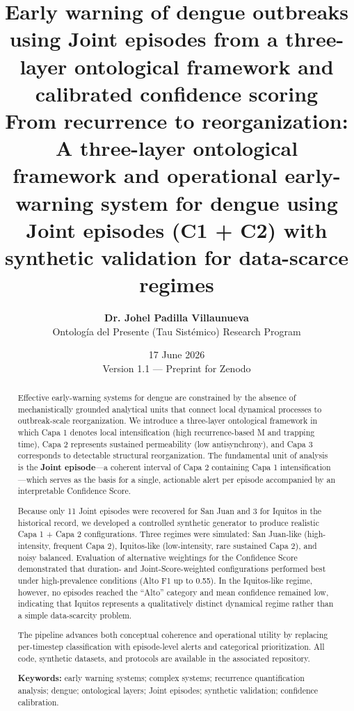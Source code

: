 \documentclass[11pt,a4paper]{article}
\title{\textbf{Early warning of dengue outbreaks using Joint episodes from a three-layer ontological framework and calibrated confidence scoring}\\[0.35em]
\large From recurrence to reorganization: A three-layer ontological framework and operational early-warning system for dengue using Joint episodes (C1 + C2) with synthetic validation for data-scarce regimes}
\author{
    \textbf{Dr. Johel Padilla Villaunueva} \\[0.25em]
    \small Ontolog\'ia del Presente (Tau Sist\'emico) Research Program
}
\date{17 June 2026 \\ \small Version 1.1 — Preprint for Zenodo}
\begin{document}
\sloppy

\maketitle

\begin{abstract}
\noindent Effective early-warning systems for dengue are constrained by the absence of mechanistically grounded analytical units that connect local dynamical processes to outbreak-scale reorganization. We introduce a three-layer ontological framework in which Capa 1 denotes local intensification (high recurrence-based M and trapping time), Capa 2 represents sustained permeability (low antisynchrony), and Capa 3 corresponds to detectable structural reorganization. The fundamental unit of analysis is the \textbf{Joint episode}—a coherent interval of Capa 2 containing Capa 1 intensification—which serves as the basis for a single, actionable alert per episode accompanied by an interpretable Confidence Score.

Because only 11 Joint episodes were recovered for San Juan and 3 for Iquitos in the historical record, we developed a controlled synthetic generator to produce realistic Capa 1 + Capa 2 configurations. Three regimes were simulated: San Juan-like (high-intensity, frequent Capa 2), Iquitos-like (low-intensity, rare sustained Capa 2), and noisy balanced. Evaluation of alternative weightings for the Confidence Score demonstrated that duration- and Joint-Score-weighted configurations performed best under high-prevalence conditions (Alto F1 up to 0.55). In the Iquitos-like regime, however, no episodes reached the “Alto” category and mean confidence remained low, indicating that Iquitos represents a qualitatively distinct dynamical regime rather than a simple data-scarcity problem.

The pipeline advances both conceptual coherence and operational utility by replacing per-timestep classification with episode-level alerts and categorical prioritization. All code, synthetic datasets, and protocols are available in the associated repository.

\vspace{0.2em}
\noindent\textbf{Keywords:} early warning systems; complex systems; recurrence quantification analysis; dengue; ontological layers; Joint episodes; synthetic validation; confidence calibration.
\end{abstract}
\end{document}
